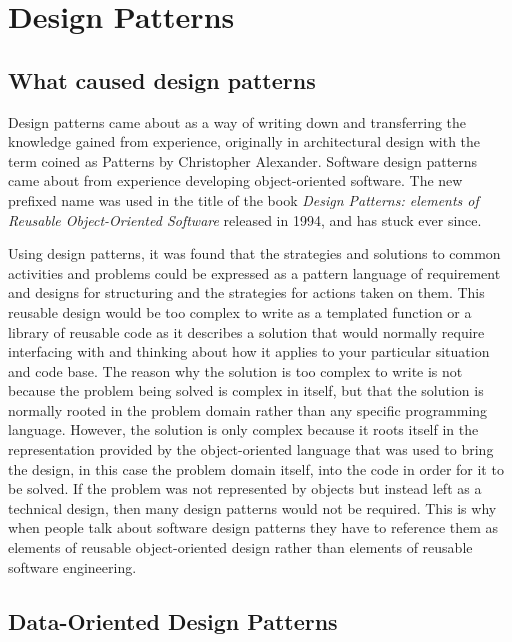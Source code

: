 \chapter{Design Patterns}\label{chap:designpatterns}

\section{What caused design patterns}

Design patterns came about as a way of writing down and transferring the
knowledge gained from experience, originally in architectural design with the
term coined as Patterns by Christopher Alexander. Software design patterns came
about from experience developing object-oriented software. The new prefixed
name was used in the title of the book \emph{Design Patterns: elements of
Reusable Object-Oriented Software} released in 1994, and has stuck ever since.

Using design patterns, it was found that the strategies and solutions to common
activities and problems could be expressed as a pattern language of requirement
and designs for structuring and the strategies for actions taken on them. This
reusable design would be too complex to write as a templated function or a
library of reusable code as it describes a solution that would normally require
interfacing with and thinking about how it applies to your particular situation
and code base. The reason why the solution is too complex to write is not
because the problem being solved is complex in itself, but that the solution is
normally rooted in the problem domain rather than any specific programming
language. However, the solution is only complex because it roots itself in the
representation provided by the object-oriented language that was used to bring
the design, in this case the problem domain itself, into the code in order for
it to be solved. If the problem was not represented by objects but instead left
as a technical design, then many design patterns would not be required. This is
why when people talk about software design patterns they have to reference them
as elements of reusable object-oriented design rather than elements of reusable
software engineering.

\section{Data-Oriented Design Patterns}

